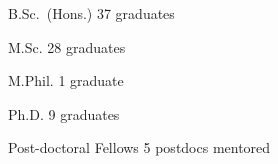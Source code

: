 


\begin{cvskills}


\cvskill
{B.Sc.~(Hons.)} %
{37 graduates} %


\cvskill
{M.Sc.}
{28 graduates}


\cvskill
{M.Phil.}
{1 graduate}


\cvskill
{Ph.D.}
{9 graduates}


\cvskill
{Post-doctoral Fellows}
{5 postdocs mentored}


\end{cvskills}